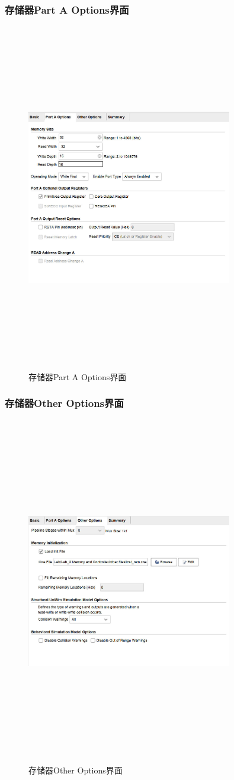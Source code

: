 \subsubsection{存储器Part A Options界面}
\begin{figure}[htbp]
    \centering
    \includegraphics[width=0.8\textwidth,height=6in,keepaspectratio]{BMG2.jpg}
    \caption{存储器Part A Options界面}
    \label{image2}
\end{figure}
\subsubsection{存储器Other Options界面}
\begin{figure}[htbp]
    \centering
    \includegraphics[width=0.8\textwidth,height=6in,keepaspectratio]{BMG3.jpg}
    \caption{存储器Other Options界面}
    \label{image3}
\end{figure}